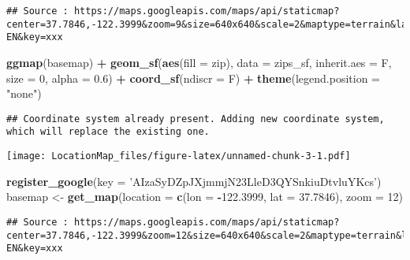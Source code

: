 \documentclass[]{article}
\newenvironment{Shaded}{\begin{snugshade}}{\end{snugshade}}
\newcommand{\KeywordTok}[1]{\textcolor[rgb]{0.13,0.29,0.53}{\textbf{#1}}}
\newcommand{\DataTypeTok}[1]{\textcolor[rgb]{0.13,0.29,0.53}{#1}}
\newcommand{\DecValTok}[1]{\textcolor[rgb]{0.00,0.00,0.81}{#1}}
\newcommand{\FloatTok}[1]{\textcolor[rgb]{0.00,0.00,0.81}{#1}}
\newcommand{\StringTok}[1]{\textcolor[rgb]{0.31,0.60,0.02}{#1}}
\newcommand{\OperatorTok}[1]{\textcolor[rgb]{0.81,0.36,0.00}{\textbf{#1}}}
\newcommand{\NormalTok}[1]{#1}
\begin{document}
\begin{verbatim}
## Source : https://maps.googleapis.com/maps/api/staticmap?center=37.7846,-122.3999&zoom=9&size=640x640&scale=2&maptype=terrain&language=en-EN&key=xxx
\end{verbatim}

\begin{Shaded}
\begin{Highlighting}[]
\KeywordTok{ggmap}\NormalTok{(basemap) }\OperatorTok{+}
\StringTok{  }\KeywordTok{geom_sf}\NormalTok{(}\KeywordTok{aes}\NormalTok{(}\DataTypeTok{fill =}\NormalTok{ zip), }\DataTypeTok{data =}\NormalTok{ zips_sf, }\DataTypeTok{inherit.aes =}\NormalTok{ F, }\DataTypeTok{size =} \DecValTok{0}\NormalTok{, }\DataTypeTok{alpha =} \FloatTok{0.6}\NormalTok{) }\OperatorTok{+}
\StringTok{  }\KeywordTok{coord_sf}\NormalTok{(}\DataTypeTok{ndiscr =}\NormalTok{ F) }\OperatorTok{+}
\StringTok{  }\KeywordTok{theme}\NormalTok{(}\DataTypeTok{legend.position =} \StringTok{"none"}\NormalTok{)}
\end{Highlighting}
\end{Shaded}

\begin{verbatim}
## Coordinate system already present. Adding new coordinate system, which will replace the existing one.
\end{verbatim}

\texttt{[image: LocationMap\_files/figure-latex/unnamed-chunk-3-1.pdf]}

\begin{Shaded}
\begin{Highlighting}[]
\KeywordTok{register_google}\NormalTok{(}\DataTypeTok{key =} \StringTok{'AIzaSyDZpJXjmmjN23LleD3QYSnkiuDtvluYKcs'}\NormalTok{)}
\NormalTok{basemap <-}\StringTok{ }\KeywordTok{get_map}\NormalTok{(}\DataTypeTok{location =} \KeywordTok{c}\NormalTok{(}\DataTypeTok{lon =} \OperatorTok{-}\FloatTok{122.3999}\NormalTok{, }\DataTypeTok{lat =} \FloatTok{37.7846}\NormalTok{), }\DataTypeTok{zoom =} \DecValTok{12}\NormalTok{)}
\end{Highlighting}
\end{Shaded}

\begin{verbatim}
## Source : https://maps.googleapis.com/maps/api/staticmap?center=37.7846,-122.3999&zoom=12&size=640x640&scale=2&maptype=terrain&language=en-EN&key=xxx
\end{verbatim}
\end{document}
